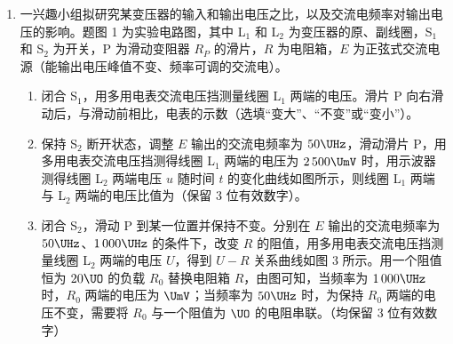\documentclass[\gkver]{gaokaozhenti}
\begin{document}
\begin{enumerate}


\item
一兴趣小组拟研究某变压器的输入和输出电压之比，以及交流电频率对输出电压的影响。题图 1 为实验电路图，其中 L$_{1}$ 和 L$_{2}$ 为变压器的原、副线圈，S$_{1}$ 和 S$_{2}$ 为开关，P 为滑动变阻器 $R_{P}$ 的滑片，$R$ 为电阻箱，$E$ 为正弦式交流电源（能输出电压峰值不变、频率可调的交流电）。
\begin{enumerate}
	\item
	闭合 S$_{1}$，用多用电表交流电压挡测量线圈 L$_{1}$ 两端的电压。滑片 P 向右滑动后，与滑动前相比，电表的示数（选填“变大”、“不变”或“变小”）。
	\item
	保持 S$_{2}$ 断开状态，调整 $E$ 输出的交流电频率为 $50\UHz$，滑动滑片 P，用多用电表交流电压挡测得线圈 L$_{1}$ 两端的电压为 $2\,500\UmV$ 时，用示波器测得线圈 L$_{2}$ 两端电压 $u$ 随时间 $t$ 的变化曲线如图所示，则线圈 L$_{1}$ 两端与 L$_{2}$ 两端的电压比值为（保留 3 位有效数字）。
	\item
	闭合 S$_{2}$，滑动 P 到某一位置并保持不变。分别在 $E$ 输出的交流电频率为 $50\UHz$、$1\,000\UHz$ 的条件下，改变 $R$ 的阻值，用多用电表交流电压挡测量线圈 L$_{2}$ 两端的电压 $U$，得到 $U-R$ 关系曲线如图 3 所示。用一个阻值恒为 $20\UO$ 的负载 $R_{0}$ 替换电阻箱 $R$，由图可知，当频率为 $1\,000\UHz$ 时，$R_{0}$ 两端的电压为 $\UmV$；当频率为 $50\UHz$ 时，为保持 $R_{0}$ 两端的电压不变，需要将 $R_{0}$ 与一个阻值为 $\UO$ 的电阻串联。（均保留 3 位有效数字）
\end{enumerate}


\end{enumerate}
\end{document}
